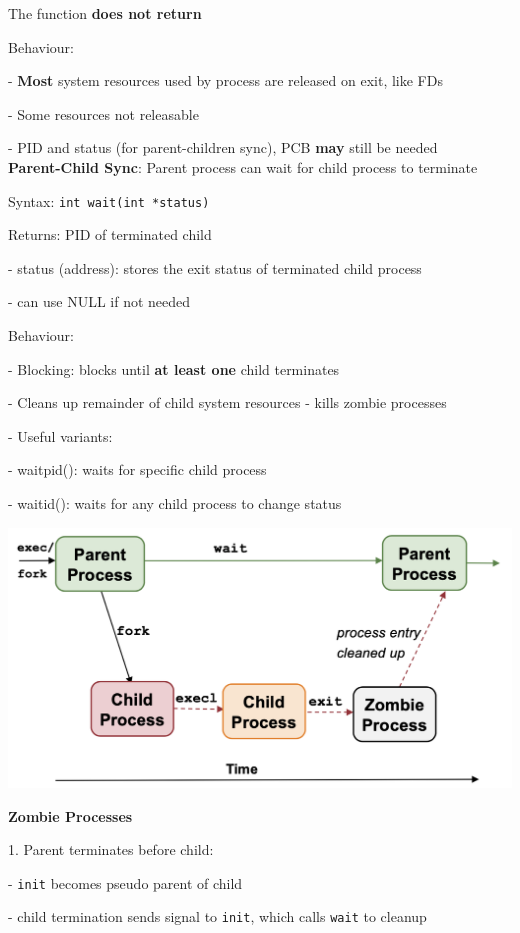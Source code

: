 \documentclass[10pt, a4paper]{article}
\newcommand{\highlight}[1]{{\color{red}\textbf{#1}}}
\newcommand{\tab}[0]{\hspace*{2mm}}
\begin{document}
\begin{multicols*}{3}
		The function \highlight{does not return}

		Behaviour:

		- \textbf{Most} system resources used by process are released on exit, like FDs

		- Some resources not releasable

		\tab{} - PID and status (for parent-children sync), PCB \highlight{may} still be needed\\

		\textbf{Parent-Child Sync}: Parent process can wait for child process to terminate

		Syntax: \texttt{int wait(int *status)}

		Returns: PID of terminated child

		\tab{} - status (address): stores the exit status of terminated child process

		\tab{} - can use NULL if not needed

		Behaviour:

		- Blocking: blocks until \highlight{at least one} child terminates

		- Cleans up remainder of child system resources - kills zombie processes

		- Useful variants:

		\tab{} - waitpid(): waits for specific child process

		\tab{} - waitid(): waits for any child process to change status

		\includegraphics[scale=.3]{./assets/parentChild.png}

		\textbf{Zombie Processes}

		1. Parent terminates before child:

		\tab{} - \texttt{init} becomes pseudo parent of child

		\tab{} - child termination sends signal to \texttt{init}, which calls \texttt{wait} to cleanup


\end{multicols*}
\end{document}
